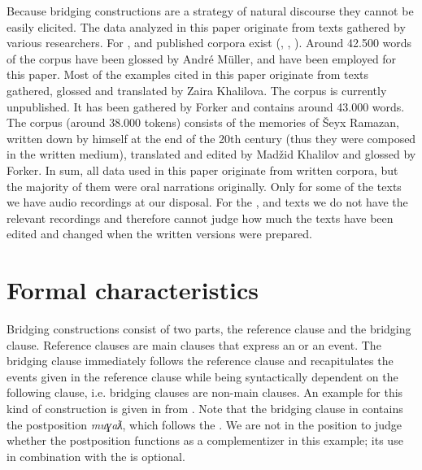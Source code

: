 \documentclass[output=paper]{LSP/langsci}
\begin{document}
Because bridging constructions are a strategy of natural discourse they cannot be easily elicited. The data analyzed in this paper originate from texts gathered by various researchers. For ,  and  published corpora exist (\citealt{vandenBerg.1995}, \citealt{Abdulaev.Abdullaev.2010}, \citealt{Karimova.2014}). Around 42.500 words of the  corpus have been glossed by André Müller, and have been employed for this paper. Most of the  examples cited in this paper originate from texts gathered, glossed and translated by Zaira Khalilova. The  corpus is currently unpublished. It has been gathered by Forker and contains around 43.000 words. The  corpus (around 38.000 tokens) consists of the memories of Šeyx Ramazan, written down by himself at the end of the 20th century (thus they were composed in the written medium), translated and edited by Madžid Khalilov and glossed by Forker. In sum, all data used in this paper originate from written corpora, but the majority of them were oral narrations originally. Only for some of the  texts we have audio recordings at our disposal. For the ,  and  texts we do not have the relevant recordings and therefore cannot judge how much the texts have been edited and changed when the written versions were prepared.

\section{Formal characteristics}
\label{sec:Formal characteristics} 
Bridging constructions consist of two parts, the reference clause and the bridging clause. Reference clauses are main clauses that express an  or an event. The bridging clause immediately follows the reference clause and recapitulates the events given in the reference clause while being syntactically dependent on the following clause, i.e. bridging clauses are non-main clauses. An example for this kind of construction is given in  from . Note that the bridging clause in  contains the postposition \textit{muɣaƛ}, which follows the . We are not in the position to judge whether the postposition functions as a complementizer in this example; its use in combination with the  is optional. 
\end{document}
